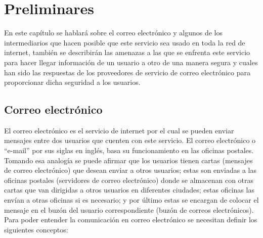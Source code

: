 \chapter{Preliminares} %
En  este  capítulo  se hablará  sobre  el  correo  electrónico  y  algunos  de  los intermediarios que hacen posible que este servicio sea usado en toda la red de  internet, también  se describirán las  amenazas a  las  que  se   enfrenta  este  servicio para  hacer  llegar  información  de  un  usuario  a  otro  de  una  manera  segura  y  cuales  han 
sido   las   respuestas   de   los   proveedores   de   servicio   de   correo   electrónico   para proporcionar dicha seguridad a los usuarios. 


\section{Correo electrónico} 
El  correo  electrónico  es  el  servicio  de  internet  por  el cual  se  pueden  enviar  mensajes entre dos usuarios que cuenten con este servicio. El correo electrónico o “e-mail”
 por sus siglas en inglés, basa su funcionamiento en las oficinas postales. Tomando esa analogía se puede afirmar  que  los  usuarios  tienen  cartas  (mensajes  de  correo  electrónico)  que desean  enviar  a  otros  usuarios;  estas  son  enviadas  a 
las  oficinas  postales (servidores de correo electrónico) donde se almacenan con otras cartas que van dirigidas a otros usuarios en diferentes ciudades; estas oficinas las envían a otras 
oficinas   si es  necesario;  y por  último estas se  encargan de colocar el mensaje en el  buzón del usuario correspondiente (buzón  de  correos  electrónicos).\\
Para poder entender la comunicación en correo electrónico se necesitan definir los siguientes conceptos:
